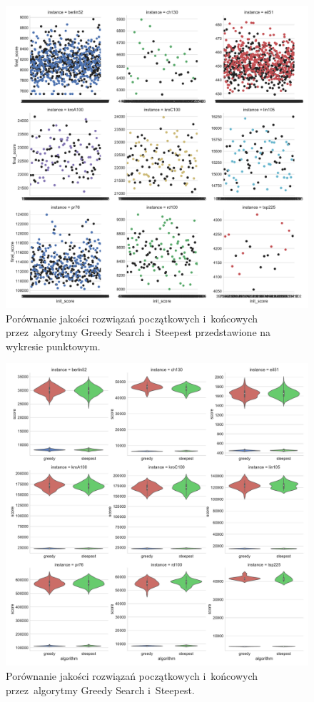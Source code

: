 \begin{figure}[H]
\begin{center}
\includegraphics[width=1.0\textwidth]{graphs/init_vs_final_score_point.pdf}
\end{center}
\caption{Porównanie jakości rozwiązań początkowych i~końcowych przez~algorytmy Greedy Search i~Steepest przedstawione na wykresie punktowym.}
\label{fig:diff_point}
\end{figure}

\begin{figure}[H]
\begin{center}
\includegraphics[width=1.0\textwidth]{graphs/init_vs_final_score_violin.pdf}
\end{center}
\caption{Porównanie jakości rozwiązań początkowych i~końcowych przez~algorytmy Greedy Search i~Steepest.}
\label{fig:diff}
\end{figure}

